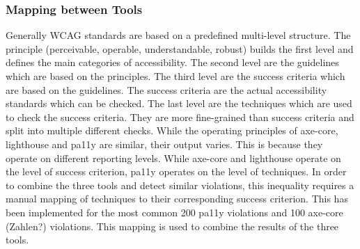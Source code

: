 \subsubsection{Mapping between Tools}
Generally WCAG standards are based on a predefined multi-level structure. The 
principle (perceivable, operable, understandable, robust) builds the first level 
and defines the main categories of accessibility. The second level are the 
guidelines which are based on the principles. The third level are the success
criteria which are based on the guidelines. The success criteria are the
actual accessibility standards which can be checked. The last level are the 
techniques which are used to check the success criteria. They are more fine-grained
than success criteria and split into multiple different checks.\newline
While the operating principles of axe-core, lighthouse and pa11y are similar, their 
output varies. This is because they operate on different reporting levels. While 
axe-core and lighthouse operate on the level of success criterion, pa11y operates 
on the level of techniques. In order to combine the three tools and detect 
similar violations, this inequality requires a manual mapping of techniques to 
their corresponding success criterion. This has been implemented for the most
common 200 pa11y violations and 100 axe-core (Zahlen?) violations. 
This mapping is used to combine the results of the three tools.

